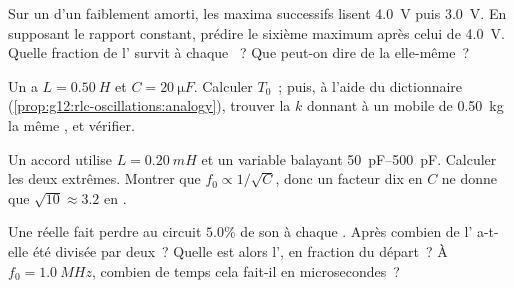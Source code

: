 \begin{exercise}[$\star\star$]\label{exo:g12:rlc-oscillations:10}
Sur un  d'un
 faiblement
amorti, les maxima successifs lisent
\qty{4.0}{V} puis \qty{3.0}{V}. En supposant le rapport constant,
prédire le sixième maximum après celui de \qty{4.0}{V}. Quelle
fraction de l'\emph{} survit à chaque
~? Que peut-on dire de la
 elle-même~?
\end{exercise}

\begin{exercise}[$\star\star$]\label{exo:g12:rlc-oscillations:11}
Un  a $L = \qty{0.50}{H}$ et
$C = \qty{20}{\micro F}$. Calculer $T_0$~; puis, à l'aide du
dictionnaire (\cref{prop:g12:rlc-oscillations:analogy}), trouver la
 $k$ donnant à un mobile de
\qty{0.50}{kg} la même , et vérifier.
\end{exercise}

\begin{exercise}[$\star\star\star$]\label{exo:g12:rlc-oscillations:12}
Un accord utilise $L = \qty{0.20}{mH}$ et un
 variable balayant
\qtyrange{50}{500}{pF}. Calculer les deux  extrêmes. Montrer
que $f_0 \propto 1/\sqrt{C}$, donc un facteur dix en $C$ ne donne que
$\sqrt{10} \approx 3.2$ en .
\end{exercise}

\begin{exercise}[$\star\star\star$]\label{exo:g12:rlc-oscillations:13}
Une  réelle fait perdre au circuit $5.0\%$ de son
 à chaque
. Après combien de
 l' a-t-elle
été divisée par deux~? Quelle est alors
l', en fraction du départ~? À
$f_0 = \qty{1.0}{MHz}$, combien de temps cela fait-il en microsecondes~?
\end{exercise}

